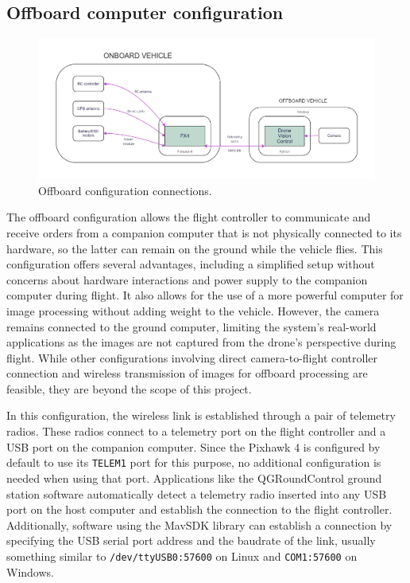 \subsection{Offboard computer configuration}
\label{subsec:offboard}

\begin{figure}
  \centering
  \includegraphics[width=\textwidth,keepaspectratio]{img/offboard-diagram.jpg}
  \caption{Offboard configuration connections.}
  \label{fig:offboard-config}
\end{figure}

The offboard configuration allows the flight controller to communicate and receive orders from a companion computer that is not physically connected to its hardware, so the latter can remain on the ground while the vehicle flies.
This configuration offers several advantages, including a simplified setup without concerns about hardware interactions and power supply to the companion computer during flight. It also allows for the use of a more powerful computer for image processing without adding weight to the vehicle. However, the camera remains connected to the ground computer, limiting the system's real-world applications as the images are not captured from the drone's perspective during flight. While other configurations involving direct camera-to-flight controller connection and wireless transmission of images for offboard processing are feasible, they are beyond the scope of this project.

In this configuration, the wireless link is established through a pair of telemetry radios.
These radios connect to a telemetry port on the flight controller and a USB port on the companion computer. 
Since the Pixhawk 4 is configured by default to use its \texttt{TELEM1} port for this purpose, no additional configuration is needed when using that port.
Applications like the QGRoundControl ground station software automatically detect a telemetry radio inserted into any USB port on the host computer and establish the connection to the flight controller.
Additionally, software using the MavSDK library can establish a connection by specifying the USB serial port address and the baudrate of the link, usually something similar to \texttt{/dev/ttyUSB0:57600} on Linux and \texttt{COM1:57600} on Windows.

